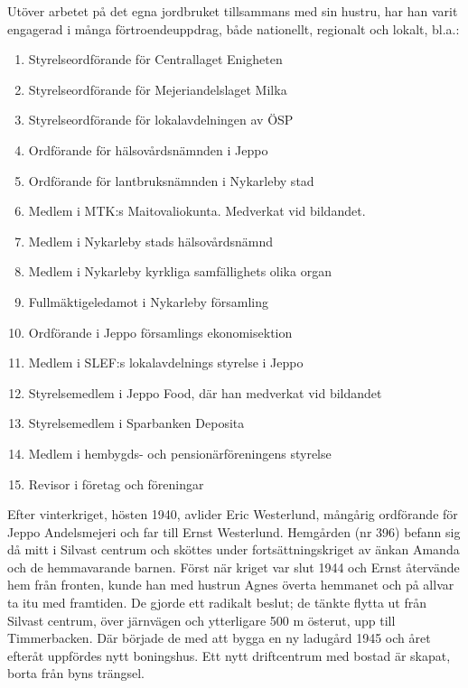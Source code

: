 Utöver arbetet på det egna jordbruket tillsammans med sin hustru, har han varit engagerad i många förtroendeuppdrag, både nationellt, regionalt och lokalt, bl.a.:
\begin{enumerate}
  \item Styrelseordförande för Centrallaget Enigheten
  \item Styrelseordförande för Mejeriandelslaget Milka
  \item Styrelseordförande för lokalavdelningen av ÖSP
  \item Ordförande för hälsovårdsnämnden i Jeppo
  \item Ordförande för lantbruksnämnden i Nykarleby stad
  \item Medlem i MTK:s Maitovaliokunta. Medverkat vid bildandet.
  \item Medlem i Nykarleby stads hälsovårdsnämnd
  \item Medlem i Nykarleby kyrkliga samfällighets olika organ
  \item Fullmäktigeledamot i Nykarleby församling
  \item Ordförande i Jeppo församlings ekonomisektion
  \item Medlem i SLEF:s lokalavdelnings styrelse i Jeppo
  \item Styrelsemedlem i Jeppo Food, där han medverkat vid bildandet
  \item Styrelsemedlem i Sparbanken Deposita
  \item Medlem i hembygds- och pensionärföreningens styrelse
  \item Revisor i företag och föreningar
\end{enumerate}


Efter vinterkriget, hösten 1940, avlider Eric Westerlund, mångårig ordförande för Jeppo Andelsmejeri och far till Ernst Westerlund. Hemgården (nr 396) befann sig då mitt i Silvast centrum och sköttes under fortsättningskriget av änkan Amanda och de hemmavarande barnen.	Först när kriget var slut 1944 och Ernst återvände hem från fronten, kunde han med hustrun Agnes överta hemmanet och på allvar ta itu med framtiden. De gjorde ett radikalt beslut; de tänkte flytta ut från Silvast centrum, över järnvägen och ytterligare 500 m österut, upp till Timmerbacken. Där började de med att bygga en ny ladugård 1945 och året efteråt uppfördes nytt boningshus. Ett nytt driftcentrum med bostad är skapat, borta från byns trängsel.

